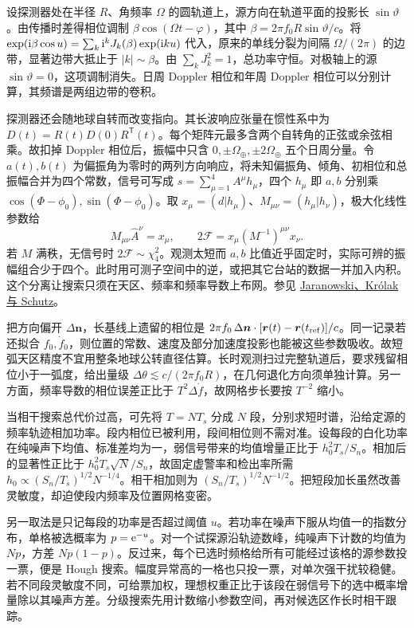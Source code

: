 设探测器处在半径 $R$、角频率 $\Omega$ 的圆轨道上，源方向在轨道平面的投影长 $\sin\vartheta$。由传播时差得相位调制 $\beta\cos(\Omega t-\varphi)$，其中 $\beta=2\pi f_0R\sin\vartheta/c$。将 $\exp(\mathrm{i}\beta\cos u)=\sum_k\mathrm{i}^k J_k(\beta)\exp(\mathrm{i} ku)$ 代入，原来的单线分裂为间隔 $\Omega/(2\pi)$ 的边带，显著边带大抵止于 $|k|\sim\beta$。由 $\sum_kJ_k^2=1$，总功率守恒。对极轴上的源 $\sin\vartheta=0$，这项调制消失。日周 Doppler 相位和年周 Doppler 相位可以分别计算，其频谱是两组边带的卷积。

探测器还会随地球自转而改变指向。其长波响应张量在惯性系中为 $D(t)=R(t)D(0)R^{\mathsf T}(t)$。每个矩阵元最多含两个自转角的正弦或余弦相乘。故扣掉 Doppler 相位后，振幅中只含 $0,\pm\Omega_\oplus,\pm2\Omega_\oplus$ 五个日周分量。令 $a(t),b(t)$ 为偏振角为零时的两列方向响应，将未知偏振角、倾角、初相位和总振幅合并为四个常数，信号可写成 $s=\sum_{\mu=1}^4 A^\mu h_\mu$，四个 $h_\mu$ 即 $a,b$ 分别乘 $\cos(\Phi-\phi_0),\sin(\Phi-\phi_0)$。取 $x_\mu=(d|h_\mu)$、$M_{\mu\nu}=(h_\mu|h_\nu)$，极大化线性参数给
\[
 M_{\mu\nu}\widehat A^\nu=x_\mu,\qquad
 2\mathcal F=x_\mu(M^{-1})^{\mu\nu}x_\nu .
\]
若 $M$ 满秩，无信号时 $2\mathcal F\sim\chi_4^2$。观测太短而 $a,b$ 比值近乎固定时，实际可辨的振幅组合少于四个。此时用可测子空间中的逆，或把其它台站的数据一并加入内积。这个分离让搜索只须在天区、频率和频率导数上布网。参见 \href{https://arxiv.org/abs/gr-qc/9804014}{Jaranowski、Królak 与 Schutz}。

把方向偏开 $\Delta\bm n$，长基线上遗留的相位是 $2\pi f_0\,\Delta\bm n\cdot[\bm r(t)-\bm r(t_{\rm ref})]/c$。同一记录若还拟合 $f_0,\dot f_0$，则位置的常数、速度及部分加速度投影也能被这些参数吸收。故短弧天区精度不宜用整条地球公转直径估算。长时观测扫过完整轨道后，要求残留相位小于一弧度，给出量级 $\Delta\theta\lesssim c/(2\pi f_0R)$，在几何退化方向须单独计算。另一方面，频率导数的相位误差正比于 $T^2\Delta\dot f$，故网格步长要按 $T^{-2}$ 缩小。

当相干搜索总代价过高，可先将 $T=N T_s$ 分成 $N$ 段，分别求短时谱，沿给定源的频率轨迹相加功率。段内相位已被利用，段间相位则不需对准。设每段的白化功率在纯噪声下均值、标准差均为一，弱信号带来的均值增量正比于 $h_0^2T_s/S_n$。相加后的显著性正比于 $h_0^2T_s\sqrt N/S_n$，故固定虚警率和检出率所需 $h_0\propto(S_n/T_s)^{1/2}N^{-1/4}$。相干相加则为 $(S_n/T_s)^{1/2}N^{-1/2}$。把短段加长虽然改善灵敏度，却迫使段内频率及位置网格变密。

另一取法是只记每段的功率是否超过阈值 $u$。若功率在噪声下服从均值一的指数分布，单格被选概率为 $p=\mathrm{e}^{-u}$。对一个试探源沿轨迹数峰，纯噪声下计数的均值为 $Np$，方差 $Np(1-p)$。反过来，每个已选时频格给所有可能经过该格的源参数投一票，便是 Hough 搜索。幅度异常高的一格也只投一票，对单次强干扰较稳健。若不同段灵敏度不同，可给票加权，理想权重正比于该段在弱信号下的选中概率增量除以其噪声方差。分级搜索先用计数缩小参数空间，再对候选区作长时相干跟踪。

